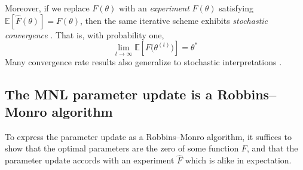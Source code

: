 \documentclass[preprint,12pt,authoryear]{elsarticle}
\begin{document}
Moreover, if we replace $F(\theta)$ with an \emph{experiment} $\hat F(\theta)$ satisfying $\mathbb{E}\left[\hat F(\theta)\right] = F(\theta)$, then the same iterative scheme exhibits \emph{stochastic convergence} \cite[][]{robbinsmonro1951, tsitsiklis1994}. That is, with  probability one,
\[\lim_{t\to \infty} \mathbb{E}\left[F\bigl(\theta^{(t)}\bigr)\right] = \theta^*\]
Many convergence rate results also generalize to stochastic interpretations \cite[][\S10.4]{kushner1997}.


\subsection{The MNL parameter update is a Robbins--Monro algorithm}
To express the parameter update as a Robbins--Monro algorithm, it suffices to show that the optimal parameters are the zero of some function $F$, and that the parameter update accords with an experiment $\hat F$ which is alike in expectation.  
\end{document}
